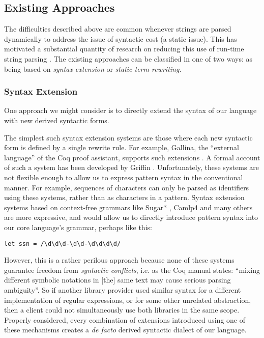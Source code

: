 	\subsection{Existing Approaches}\label{sec:syntax-existing} The difficulties described above are common whenever strings are parsed dynamically to address the issue of syntactic cost (a static issue). %
	This has motivated a substantial quantity of research on reducing this use of run-time string parsing \cite{Bravenboer:2007:PIA:1289971.1289975}. The existing approaches can be classified in  one of two ways: as being based on \emph{syntax extension} or \emph{static term rewriting}. 

\subsubsection{Syntax Extension}\label{sec:syntax-extension}
One approach we might consider is to directly extend the syntax of our language with new derived syntactic forms.%

The simplest such syntax extension systems are those where each new syntactic form is defined by a single rewrite rule. For example, Gallina, the ``external language'' of the Coq proof assistant, supports such extensions \cite{Coq:manual}. A formal account of such a system has been developed by Griffin \cite{5134}. Unfortunately, these systems are not flexible enough to allow us to express pattern syntax in the conventional manner. For example, sequences of characters  can only be parsed as identifiers using these systems, rather than as characters in a pattern. Syntax extension systems based on context-free grammars like  Sugar* \cite{erdweg2013framework}, Camlp4 \cite{ocaml-manual} and many others are more expressive, and would allow us to directly introduce pattern syntax into our core language's grammar, perhaps like this:
\begin{lstlisting}[numbers=none]
let ssn = /\d\d\d-\d\d-\d\d\d\d/
\end{lstlisting}

However, this is a rather perilous approach because none of these systems guarantee freedom from \emph{syntactic conflicts}, i.e. as the Coq manual states: ``mixing different symbolic notations in [the] same text may cause serious parsing ambiguity''. So if another library provider used similar syntax for a different implementation of regular expressions, or for some other unrelated abstraction, then a client could not simultaneously use both libraries in the same scope. Properly considered, every combination of extensions introduced using one of these mechanisms creates a \emph{de facto} derived syntactic dialect of our language. %

